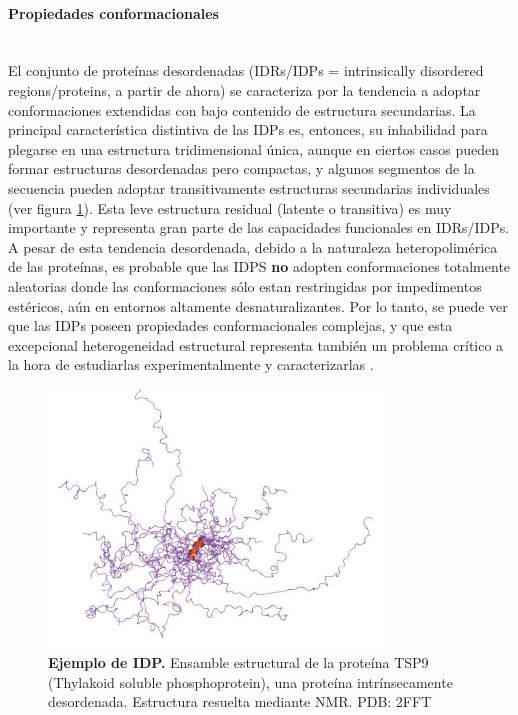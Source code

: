 \paragraph{Propiedades conformacionales} \hspace{0pt} \\
\indent El conjunto de proteínas desordenadas (IDRs/IDPs = intrinsically disordered regions/proteins, a partir de ahora) se caracteriza por la tendencia a adoptar conformaciones extendidas con bajo contenido de estructura secundarias.
La principal característica distintiva de las IDPs es, entonces, su inhabilidad para plegarse en una estructura tridimensional única, aunque en ciertos casos
pueden formar estructuras desordenadas pero compactas, y algunos segmentos de la secuencia pueden adoptar transitivamente estructuras secundarias individuales (ver figura \ref{idpExample}).
Esta leve estructura residual (latente o transitiva) es muy importante y representa gran parte de las capacidades funcionales en IDRs/IDPs.
A pesar de esta tendencia desordenada, debido a la naturaleza heteropolimérica de las proteínas, es probable que las IDPS \textbf{no} adopten conformaciones 
totalmente aleatorias donde las conformaciones sólo estan restringidas por impedimentos estéricos, aún en entornos altamente desnaturalizantes. %
Por lo tanto, se puede ver que las IDPs poseen propiedades conformacionales complejas, y que esta 
excepcional heterogeneidad estructural representa también un problema crítico a la hora de estudiarlas experimentalmente y caracterizarlas \cite{eliezer2009biophysical}.


\begin{figure}[h]
\centering
\includegraphics[width=0.8\textwidth]{img/idpExample-TSP9.jpg} 
\caption{\textbf{Ejemplo de IDP.} Ensamble estructural de la proteína TSP9 (Thylakoid soluble phosphoprotein), una proteína intrínsecamente desordenada. Estructura resuelta mediante NMR. PDB: 2FFT} 
\label{idpExample}
\end{figure}



